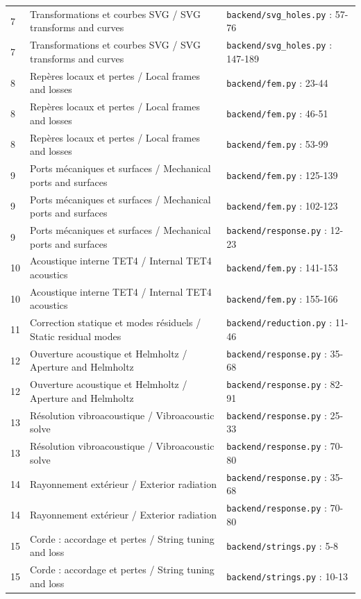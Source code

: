 \documentclass[10pt,a4paper]{article}
\begin{document}
\begin{longtable}{p{8mm}p{75mm}p{65mm}}
7 & Transformations et courbes SVG / SVG transforms and curves & \texttt{backend/svg\_holes.py} : 57-76\\[3pt]
7 & Transformations et courbes SVG / SVG transforms and curves & \texttt{backend/svg\_holes.py} : 147-189\\[3pt]
8 & Repères locaux et pertes / Local frames and losses & \texttt{backend/fem.py} : 23-44\\[3pt]
8 & Repères locaux et pertes / Local frames and losses & \texttt{backend/fem.py} : 46-51\\[3pt]
8 & Repères locaux et pertes / Local frames and losses & \texttt{backend/fem.py} : 53-99\\[3pt]
9 & Ports mécaniques et surfaces / Mechanical ports and surfaces & \texttt{backend/fem.py} : 125-139\\[3pt]
9 & Ports mécaniques et surfaces / Mechanical ports and surfaces & \texttt{backend/fem.py} : 102-123\\[3pt]
9 & Ports mécaniques et surfaces / Mechanical ports and surfaces & \texttt{backend/response.py} : 12-23\\[3pt]
10 & Acoustique interne TET4 / Internal TET4 acoustics & \texttt{backend/fem.py} : 141-153\\[3pt]
10 & Acoustique interne TET4 / Internal TET4 acoustics & \texttt{backend/fem.py} : 155-166\\[3pt]
11 & Correction statique et modes résiduels / Static residual modes & \texttt{backend/reduction.py} : 11-46\\[3pt]
12 & Ouverture acoustique et Helmholtz / Aperture and Helmholtz & \texttt{backend/response.py} : 35-68\\[3pt]
12 & Ouverture acoustique et Helmholtz / Aperture and Helmholtz & \texttt{backend/response.py} : 82-91\\[3pt]
13 & Résolution vibroacoustique / Vibroacoustic solve & \texttt{backend/response.py} : 25-33\\[3pt]
13 & Résolution vibroacoustique / Vibroacoustic solve & \texttt{backend/response.py} : 70-80\\[3pt]
14 & Rayonnement extérieur / Exterior radiation & \texttt{backend/response.py} : 35-68\\[3pt]
14 & Rayonnement extérieur / Exterior radiation & \texttt{backend/response.py} : 70-80\\[3pt]
15 & Corde : accordage et pertes / String tuning and loss & \texttt{backend/strings.py} : 5-8\\[3pt]
15 & Corde : accordage et pertes / String tuning and loss & \texttt{backend/strings.py} : 10-13\\[3pt]

\end{longtable}
\end{document}
